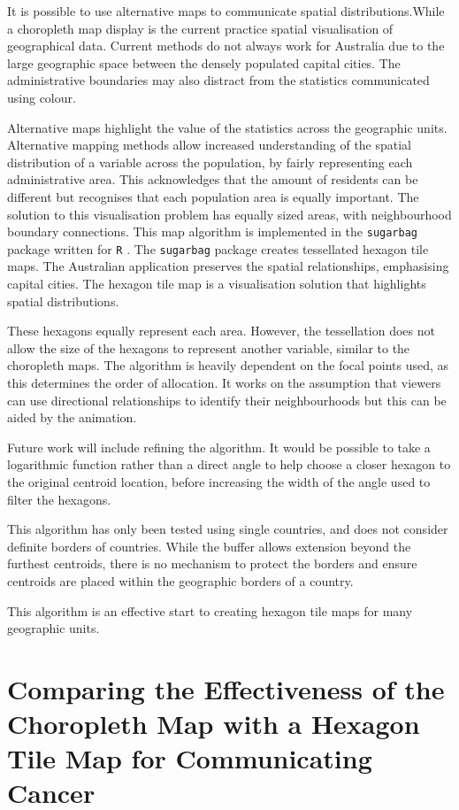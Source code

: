 \documentclass{monashthesis}
\begin{document}
It is possible to use alternative maps to communicate spatial distributions.While a choropleth map display is the current practice spatial visualisation of geographical data. Current methods do not always work for Australia due to the large geographic space between the densely populated capital cities. The administrative boundaries may also distract from the statistics communicated using colour.

Alternative maps highlight the value of the statistics across the geographic units. Alternative mapping methods allow increased understanding of the spatial distribution of a variable across the population, by fairly representing each administrative area. This acknowledges that the amount of residents can be different but recognises that each population area is equally important. The solution to this visualisation problem has equally sized areas, with neighbourhood boundary connections. This map algorithm is implemented in the \texttt{sugarbag} \autocite{sugarbag} package written for \texttt{R} \autocite{R}.
The \texttt{sugarbag} package creates tessellated hexagon tile maps. The Australian application preserves the spatial relationships, emphasising capital cities. The hexagon tile map is a visualisation solution that highlights spatial distributions.

These hexagons equally represent each area. However, the tessellation does not allow the size of the hexagons to represent another variable, similar to the choropleth maps.
The algorithm is heavily dependent on the focal points used, as this determines the order of allocation. It works on the assumption that viewers can use directional relationships to identify their neighbourhoods but this can be aided by the animation.

Future work will include refining the algorithm. It would be possible to take a logarithmic function rather than a direct angle to help choose a closer hexagon to the original centroid location, before increasing the width of the angle used to filter the hexagons.

This algorithm has only been tested using single countries, and does not consider definite borders of countries. While the buffer allows extension beyond the furthest centroids, there is no mechanism to protect the borders and ensure centroids are placed within the geographic borders of a country.

This algorithm is an effective start to creating hexagon tile maps for many geographic units.

\hypertarget{ch:experiment}{%
\chapter{Comparing the Effectiveness of the Choropleth Map with a Hexagon Tile Map for Communicating Cancer}\label{ch:experiment}}
\end{document}
